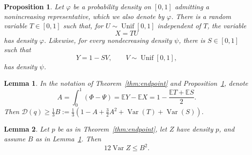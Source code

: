 \documentclass[10pt,a4paper]{amsart}
\newtheorem{prop}{Proposition}
\newtheorem{lem}{Lemma}
\newcommand{\E}{\mathbb E}
\newcommand{\Gini}{\mathcal D}
\newcommand{\Unif}{\operatorname{Unif}}
\newcommand{\Var}{\operatorname{Var}}
\begin{document}
\begin{prop} \label{prop:monotone_factoriz}
Let $\varphi$ be a probability density on $[0,1]$ admitting a nonincreasing representative, which we also denote by $\varphi$. There is a random variable $T\in[0,1]$ such that, for $U\sim\Unif[0,1]$ independent of $T$, the variable
$$
 X=TU
$$
has density $\varphi$. Likewise, for every nondecreasing density $\psi$, there is $S\in[0,1]$ such that
$$
 Y=1-SV,
 \qquad V\sim\Unif[0,1],
$$
has density $\psi$.
\end{prop}

\begin{lem}\label{lem:low_bound_enpdpoint}
    In the notation of Theorem~\ref{thm:endpoint} and Proposition~\ref{prop:monotone_factoriz}, denote 
    $$ A=\int_0^1(\Phi-\Psi)
   =\E Y-\E X
   =1-\frac{\E T+\E S}{2}.$$
   Then $\Gini(q) \geq \frac{1}{3} B := \frac{1}{3}(1-A+\frac{3}{2}A^2 + \Var(T) + \Var(S)).$
\end{lem}

\begin{lem} \label{lem:upper_bound} Let $p$ be as in Theorem~\ref{thm:endpoint}, let $Z$ have density $p$, and assume $B$ as in Lemma~\ref{lem:low_bound_enpdpoint}. Then
$$ 12\Var Z\le B^2.$$

\end{lem}
\end{document}
